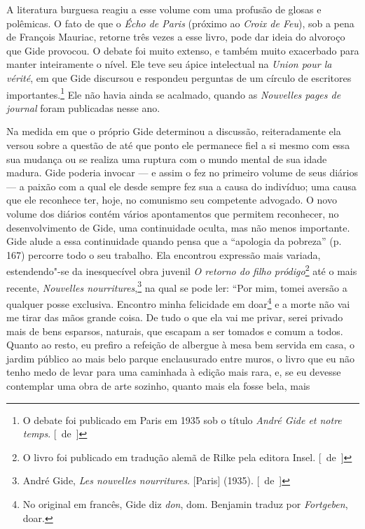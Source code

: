 A literatura burguesa reagiu a esse volume com uma profusão de glosas e
polêmicas. O fato de que o \emph{Écho de Paris} (próximo ao \emph{Croix de Feu}), sob a pena de François Mauriac, retorne três vezes a esse
livro, pode dar ideia do alvoroço que Gide provocou. O debate foi muito
extenso, e também muito exacerbado para manter inteiramente o nível. Ele
teve seu ápice intelectual na \emph{Union pour la vérité}, em que Gide
discursou e respondeu perguntas de um círculo de escritores
importantes.\footnote{O debate foi publicado em Paris em 1935 sob o
  título \emph{André Gide et notre temps}. [~de~]} Ele não havia ainda se
acalmado, quando as \emph{Nouvelles pages de journal} foram publicadas
nesse ano.

Na medida em que o próprio Gide determinou a discussão, reiteradamente
ela versou sobre a questão de até que ponto ele permanece fiel a si
mesmo com essa sua mudança ou se realiza uma ruptura com o mundo mental
de sua idade madura. Gide poderia invocar --- e assim o fez no primeiro
volume de seus diários --- a paixão com a qual ele desde sempre fez sua a
causa do indivíduo; uma causa que ele reconhece ter, hoje, no comunismo seu
competente advogado. O novo volume dos diários contém vários apontamentos que
permitem reconhecer, no desenvolvimento de Gide, uma continuidade oculta, mas não menos importante. Gide alude a essa continuidade quando pensa
que a ``apologia da pobreza'' (p. 167) percorre todo o seu trabalho.
Ela encontrou expressão mais variada, estendendo"-se da inesquecível obra
juvenil \emph{O retorno do filho pródigo}\footnote{O livro foi
  publicado em tradução alemã de Rilke pela editora Insel. [~de~]} até o
mais recente, \emph{Nouvelles nourritures},\footnote{André Gide,
  \emph{Les nouvelles nourritures}. {[}Paris{]} (1935). [~de~]} na qual
se pode ler: ``Por mim, tomei aversão a qualquer posse exclusiva.
Encontro minha felicidade em doar\footnote{No original em
  francês, Gide diz \emph{don}, dom. Benjamin traduz por \emph{Fortgeben},
  doar. \versal{[N.~T.]}} e a morte não vai me tirar das mãos grande coisa. De tudo o que
ela vai me privar, serei privado mais de bens esparsos, naturais, que
escapam a ser tomados e comum a todos. Quanto ao resto, eu prefiro a
refeição de albergue à mesa bem servida em casa, o jardim público ao
mais belo parque enclausurado entre muros, o livro que eu não tenho medo
de levar para uma caminhada à edição mais rara, e, se eu devesse
contemplar uma obra de arte sozinho, quanto mais ela fosse bela, mais

